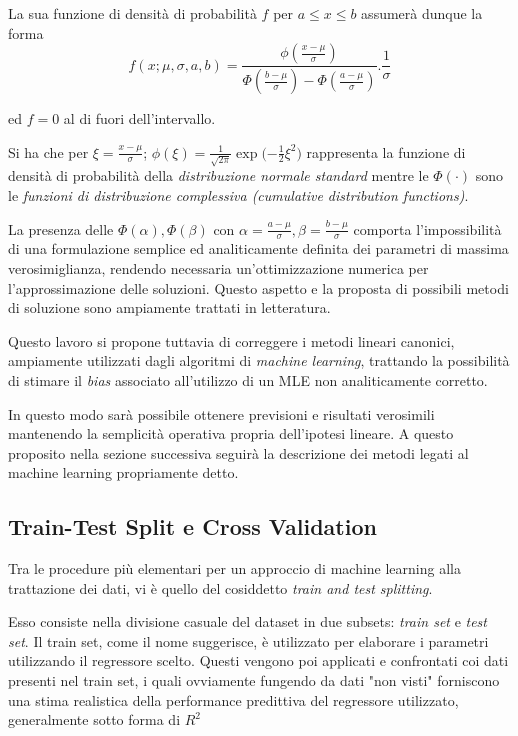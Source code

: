 \documentclass[12pt,openright,twoside,a4paper]{book}
\begin{document}
La sua funzione di densità di probabilità $f$ per $a\leq x \leq b$ assumerà dunque la forma
\begin{equation}
f(x;\mu,\sigma,a,b) = \frac{\phi(\frac{x - \mu}{\sigma})}{\Phi(\frac{b - \mu}{\sigma}) - \Phi(\frac{a - \mu}{\sigma}) }{.}\frac{1}{\sigma}
\end{equation}

ed $f=0$ al di fuori dell'intervallo.

Si ha che per $	\xi=\frac{x-\mu}{\sigma}$; ${\phi(\xi)=\frac{1}{\sqrt{2 \pi}}\exp{(-\frac{1}{2}\xi^2})} $ rappresenta la funzione di densità di probabilità della \textit{distribuzione normale standard} mentre le ${\Phi(\cdot)}$ sono le \textit{funzioni di distribuzione complessiva (cumulative distribution functions)}. \cite{TGMLE}

La presenza delle $\Phi(\alpha),\Phi(\beta)$ con $\alpha=\frac{a-\mu}{\sigma}, \beta=\frac{b-\mu} {\sigma}$ comporta l'impossibilità di una formulazione semplice ed analiticamente definita dei parametri di massima verosimiglianza, rendendo necessaria un'ottimizzazione numerica per l'approssimazione delle soluzioni.
Questo aspetto e la proposta di possibili metodi di soluzione sono ampiamente trattati in letteratura. \cite{econ}

Questo lavoro si propone tuttavia di correggere i metodi lineari canonici, ampiamente utilizzati dagli algoritmi di \textit{machine learning}, trattando la possibilità di stimare il \textit{bias} associato all'utilizzo di un MLE non analiticamente corretto.

In questo modo sarà possibile ottenere previsioni e risultati verosimili mantenendo la semplicità operativa propria dell'ipotesi lineare.
A questo proposito nella sezione successiva seguirà la descrizione dei metodi legati al machine learning propriamente detto.

\subsection{Train-Test Split e Cross Validation}
Tra le procedure più elementari per un approccio di machine learning alla trattazione dei dati, vi è quello del cosiddetto \textit{train and test splitting}.

Esso consiste nella divisione casuale del dataset in due subsets: \textit{train set} e \textit{test set}.
Il train set, come il nome suggerisce, è utilizzato per elaborare i parametri utilizzando il regressore scelto.
Questi vengono poi applicati e confrontati coi dati presenti nel train set, i quali ovviamente fungendo da dati "non visti" forniscono una stima realistica della performance predittiva del regressore utilizzato, generalmente sotto forma di $R^2$
\end{document}
